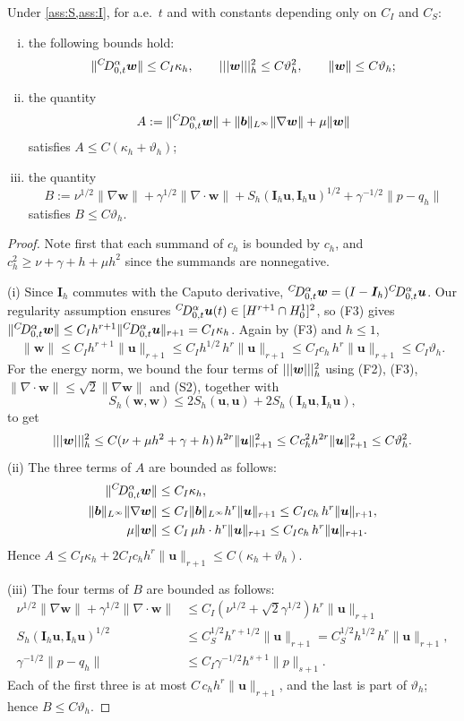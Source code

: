 \begin{lemma}\label{lem:interp}
Under \cref{ass:S,ass:I}, for a.e.\ $t$ and with constants depending only on $C_I$ and $C_S$:
\begin{enumerate}[(i),leftmargin=2.4em]
\item the following bounds hold:
\[
\|{}^{C}\!D_{0,t}^{\alpha}\bm w\|\le C_I\kappa_h,\qquad |||\bm w|||_h^2\le C\vartheta_h^2,\qquad \|\bm w\|\le C\vartheta_h ;
\]
\item the quantity
\[
A:=\|{}^{C}\!D_{0,t}^{\alpha}\bm w\|+\|\boldsymbol b\|_{L^\infty}\|\nabla\bm w\|+\mu\|\bm w\|
\]
satisfies $A\le C(\kappa_h+\vartheta_h)$;
\item the quantity
\[
B:=\nu^{1/2}\|\nabla\bm w\|+\gamma^{1/2}\|\nabla\!\cdot\bm w\|+S_h(\bm I_h\bm u,\bm I_h\bm u)^{1/2}+\gamma^{-1/2}\|p-q_h\|
\]
satisfies $B\le C\vartheta_h$.
\end{enumerate}
\end{lemma}
\begin{proof}
Note first that each summand of $c_h$ is bounded by $c_h$, and $c_h^2\ge\nu+\gamma+h+\mu h^2$ since the summands are nonnegative.

(i) Since $\bm I_h$ commutes with the Caputo derivative, ${}^{C}\!D_{0,t}^{\alpha}\bm w=(I-\bm I_h){}^{C}\!D_{0,t}^{\alpha}\bm u$. Our regularity assumption ensures ${}^{C}\!D_{0,t}^{\alpha}\bm u(t)\in[H^{r+1}\cap H^1_0]^2$, so (F3) gives $\|{}^{C}\!D_{0,t}^{\alpha}\bm w\|\le C_Ih^{r+1}\|{}^{C}\!D_{0,t}^{\alpha}\bm u\|_{r+1}=C_I\kappa_h$. Again by (F3) and $h\le1$,
\[
\|\bm w\|\le C_Ih^{r+1}\|\bm u\|_{r+1}\le C_Ih^{1/2}\,h^r\|\bm u\|_{r+1}\le C_Ic_h\,h^r\|\bm u\|_{r+1}\le C_I\vartheta_h .
\]
For the energy norm, we bound the four terms of $|||\bm w|||_h^2$ using (F2), (F3), $\|\nabla\!\cdot\bm w\|\le\sqrt2\|\nabla\bm w\|$ and (S2), together with 
$$S_h(\bm w,\bm w)\le2S_h(\bm u,\bm u)+2S_h(\bm I_h\bm u,\bm I_h\bm u),$$
to get
$$|||\bm w|||_h^2\le C(\nu+\mu h^2+\gamma+h)\,h^{2r}\|\bm u\|_{r+1}^2\le Cc_h^2h^{2r}\|\bm u\|_{r+1}^2\le C\vartheta_h^2.$$
(ii) The three terms of $A$ are bounded as follows:
\[
\begin{aligned}
\|{}^{C}\!D_{0,t}^{\alpha}\bm w\|&\le C_I\kappa_h,\\
\|\boldsymbol b\|_{L^\infty}\|\nabla\bm w\|&\le C_I\|\boldsymbol b\|_{L^\infty}h^r\|\bm u\|_{r+1}\le C_Ic_h\,h^r\|\bm u\|_{r+1},\\
\mu\|\bm w\|&\le C_I\,\mu h\cdot h^r\|\bm u\|_{r+1}\le C_Ic_h\,h^r\|\bm u\|_{r+1}.
\end{aligned}
\]
Hence $A\le C_I\kappa_h+2C_Ic_hh^r\|\bm u\|_{r+1}\le C(\kappa_h+\vartheta_h)$.

(iii) The four terms of $B$ are bounded as follows:
\[
\begin{aligned}
\nu^{1/2}\|\nabla\bm w\|
+ \gamma^{1/2}\|\nabla\!\cdot\bm w\| &\le C_I \left(\nu^{1/2} + \sqrt{2} \gamma^{1/2} \right) h^r\|\bm u\|_{r+1} \\
S_h(\bm I_h\bm u,\bm I_h\bm u)^{1/2}&\le C_S^{1/2}h^{r+1/2}\|\bm u\|_{r+1}=C_S^{1/2}h^{1/2}\,h^r\|\bm u\|_{r+1},\\
\gamma^{-1/2}\|p-q_h\|&\le C_I\gamma^{-1/2}h^{s+1}\|p\|_{s+1}.
\end{aligned}
\]
Each of the first three is at most $C\,c_hh^r\|\bm u\|_{r+1}$, and the last is part of $\vartheta_h$; hence $B\le C\vartheta_h$.
\end{proof}


